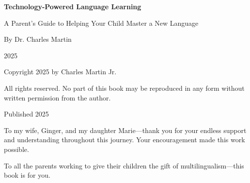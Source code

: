 \documentclass[11pt,oneside]{book}
\newcommand{\frontmatter}{
  \cleardoublepage
  \pagenumbering{roman}
  \setcounter{page}{1}
}
\begin{document}

\begin{titlepage}
\centering
\vspace*{2in}

{\Huge\sffamily\bfseries Technology-Powered Language Learning\par}

\vspace{0.5in}

{\Large\sffamily A Parent's Guide to Helping Your Child Master a New Language\par}

\vspace{1.5in}

{\large\sffamily By Dr. Charles Martin\par}

\vfill

{\large 2025\par}

\end{titlepage}


\frontmatter

\cleardoublepage
\thispagestyle{empty}
\vspace*{\fill}
\begin{center}
\small

Copyright 2025 by Charles Martin Jr.

\vspace{12pt}

All rights reserved. No part of this book may be reproduced in any form without written permission from the author.

\vspace{12pt}

Published 2025

\end{center}
\vspace*{\fill}
\clearpage

\cleardoublepage
\thispagestyle{empty}
\vspace*{2in}
\begin{center}
\itshape

To my wife, Ginger, and my daughter Marie—thank you for your endless support and understanding throughout this journey. Your encouragement made this work possible.

\vspace{0.5in}

To all the parents working to give their children the gift of multilingualism—this book is for you.

\end{center}
\clearpage
\end{document}
